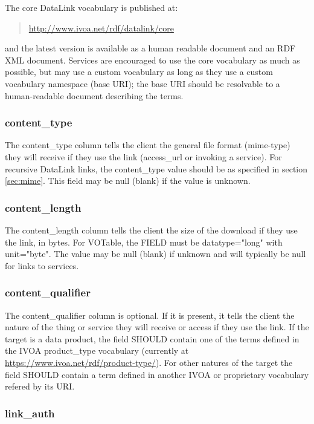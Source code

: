 \documentclass[11pt,a4paper]{ivoa}
\newcommand{\attval}[2]{#1={\allowbreak}{"}#2{"}}
\begin{document}
The core DataLink vocabulary is published at:
\begin{quote}
  \url{http://www.ivoa.net/rdf/datalink/core}
\end{quote}
and the latest version is available as a human readable document and an
RDF XML document. Services are encouraged to use the core vocabulary
as much as possible, but may use a custom vocabulary as long as they
use a custom vocabulary namespace (base URI); the base URI should be
resolvable to a human-readable document describing the terms.

\subsubsection{content\_type}

The content\_type column tells the client the general file format
(mime-type) they will receive if they use the link
(access\_url or invoking a service).
For recursive DataLink links, the content\_type value should
be as specified in section \ref{sec:mime}.
This field may be null (blank) if the value is unknown.

\subsubsection{content\_length}

The content\_length column tells the client the size of the download
if they use the link, in bytes. For VOTable, the FIELD must be
\attval{datatype}{long} with \attval{unit}{byte}.
The value may be null (blank)
if unknown and will typically be null for links to services.

\subsubsection{content\_qualifier}

The content\_qualifier column is optional. If it is present, it tells 
the client the nature of the thing or service they will receive or access 
if they use the link. If the target is a data product, the field SHOULD contain 
one of the terms defined in the IVOA product\_type vocabulary (currently at 
\url{https://www.ivoa.net/rdf/product-type/}). For other natures of the target 
the field SHOULD contain a term defined in another IVOA or proprietary vocabulary 
refered by its URI.

\subsubsection{link\_auth}
\end{document}
